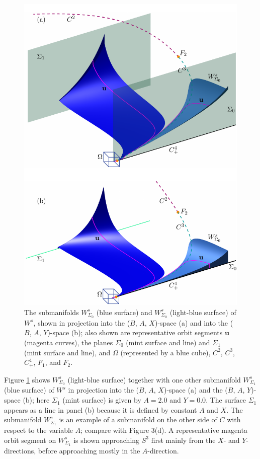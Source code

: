 \documentclass{ws-ijbc}
\begin{document}
\begin{figure}[H]
\centering
\includegraphics[]{./figures/MKMO_5.pdf}
\caption{The submanifolds $W^{s}_{\Sigma_0}$ (blue surface) and $W^{s}_{\Sigma_0}$ (light-blue surface) of $W^s$, shown in projection into the ($B$, $A$, $X$)-space (a) and into the ($B$, $A$, $Y$)-space (b); also shown are representative orbit segments $\mathbf{u}$ (magenta curves), the planes $\Sigma_0$ (mint surface and line) and $\Sigma_1$ (mint surface and line), and $\Omega$ (represented by a blue cube), $C^2$, $C^3$, $C^4_+$, $F_1$, and $F_2$.}
\label{figure_5}
\end{figure}

Figure \ref{figure_5} shows $W^s_{\Sigma_0}$ (light-blue surface) together with one other submanifold $W^{s}_{\Sigma_1}$ (blue surface) of $W^{s}$ in projection into the ($B$, $A$, $X$)-space (a) and the ($B$, $A$, $Y$)-space (b); here $\Sigma_1$ (mint surface) is given by $A=2.0$ and $Y=0.0$.  The surface $\Sigma_1$ appears as a line in panel (b) because it is defined by constant $A$ and $X$.  The submanifold $W^s_{\Sigma_1}$ is an example of a submanifold on the other side of $C$ with respect to the variable $A$; compare with Figure 3(d).  A representative magenta orbit segment on $W^s_{\Sigma_1}$ is shown approaching $S^3$ first mainly from the $X$- and $Y$-directions, before approaching mostly in the $A$-direction.
\end{document}
